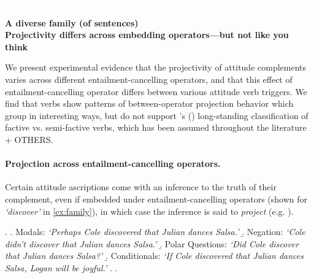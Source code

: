 \documentclass[12pt, a4paper]{scrartcl}
\newcommand{\posscite}[1]{\citeauthor{#1}'s (\citeyear{#1})}
\begin{document}

\textcolor{white}{.} \vspace{-3.9\baselineskip} \\
\begin{center}
	\textbf{\large%
		A diverse family (of sentences)\\ Projectivity differs across embedding operators---but not like you think}
\end{center}


\vspace{-.4\baselineskip}
	\noindent We present experimental evidence that the projectivity of attitude complements varies across different entailment-cancelling operators, and that this effect of entailment-cancelling operator differs between various attitude verb triggers. We find that verbs show patterns of between-operator projection behavior which group in interesting ways, but 
	do not support \posscite{karttunen_observations_1971} long-standing classification of factive vs. semi-factive verbs, which has been assumed throughout the literature \citep[e.g.][]{djarv_cognitive_2018} + OTHERS.

\vspace{-\baselineskip}
\paragraph{Projection across entailment-cancelling operators.}  \hspace{-1em}
	Certain attitude ascriptions come with an inference to the truth of their complement, even if embedded under entailment-cancelling operators (shown for \emph{\lq discover\rq} in \ref{ex:family}), in which case the inference is said to \emph{project} (e.g. \citealp{karttunen_observations_1971}).

	\vspace{-.3\baselineskip}
	\ex. \label{ex:family}
		\a. \label{ex:mod}
			Modals: \hfill
			\emph{\lq Perhaps Cole discovered that Julian dances Salsa.\rq}
		\b. \label{ex:neg}
			Negation: \hfill
			\emph{\lq Cole didn't discover that Julian dances Salsa.\rq}
		\b. \label{ex:q}
			Polar Questions: \hfill
			\emph{\lq Did Cole discover that Julian dances Salsa?\rq}
		\b. \label{ex:cond}
			Conditionals: \hfill
			\emph{\lq If Cole discovered that Julian dances Salsa, Logan will be joyful.\rq}
		\z.
	\z.
\end{document}
